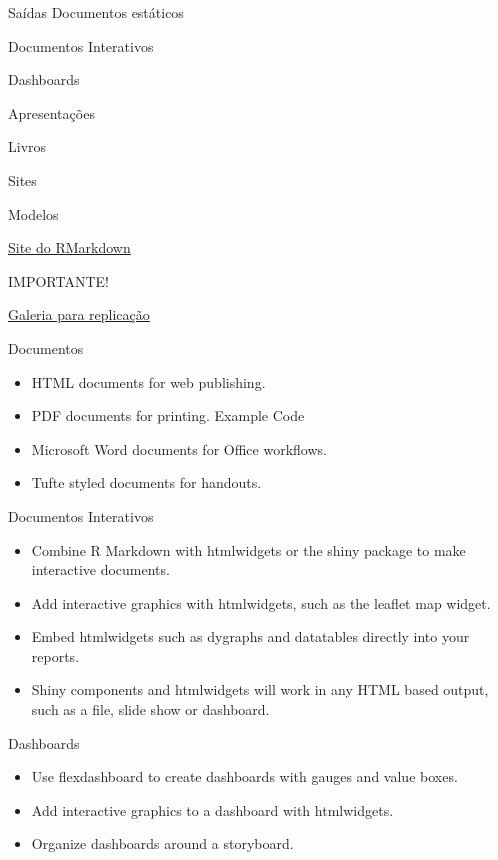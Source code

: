 \documentclass[
  9pt,
  ignorenonframetext,
]{beamer}
\begin{document}
\begin{frame}{Saídas}
\protect\hypertarget{sauxeddas}{}
Documentos estáticos

Documentos Interativos

Dashboards

Apresentações

Livros

Sites

Modelos
\end{frame}

\begin{frame}{}
\protect\hypertarget{section-3}{}
\href{https://rmarkdown.rstudio.com/}{Site do RMarkdown}

IMPORTANTE!

\href{https://rmarkdown.rstudio.com/gallery.html}{Galeria para
replicação}
\end{frame}

\begin{frame}{Documentos}
\protect\hypertarget{documentos}{}
\begin{itemize}
\item
  HTML documents for web publishing.
\item
  PDF documents for printing. Example Code
\item
  Microsoft Word documents for Office workflows.
\item
  Tufte styled documents for handouts.
\end{itemize}
\end{frame}

\begin{frame}{Documentos Interativos}
\protect\hypertarget{documentos-interativos}{}
\begin{itemize}
\item
  Combine R Markdown with htmlwidgets or the shiny package to make
  interactive documents.
\item
  Add interactive graphics with htmlwidgets, such as the leaflet map
  widget.
\item
  Embed htmlwidgets such as dygraphs and datatables directly into your
  reports.
\item
  Shiny components and htmlwidgets will work in any HTML based output,
  such as a file, slide show or dashboard.
\end{itemize}
\end{frame}

\begin{frame}{Dashboards}
\protect\hypertarget{dashboards}{}
\begin{itemize}
\item
  Use flexdashboard to create dashboards with gauges and value boxes.
\item
  Add interactive graphics to a dashboard with htmlwidgets.
\item
  Organize dashboards around a storyboard.
\end{itemize}
\end{frame}
\end{document}
